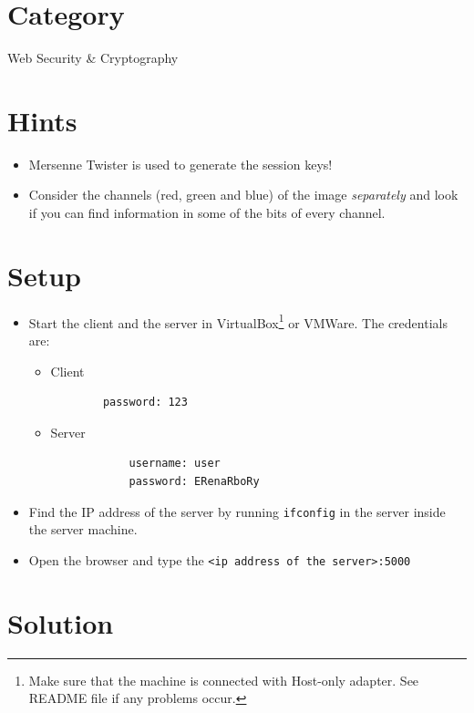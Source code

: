 \documentclass[11pt]{article}
\begin{document}
\section{Category}
Web Security \& Cryptography

\section{Hints}
\begin{itemize}
\item Mersenne Twister is used to generate the session keys!
\item Consider the channels (red, green and blue) of the image \textit{separately} and look if you can find information in some of the bits of every channel. 
\end{itemize}

\section{Setup}
\begin{itemize}
\item Start the client and the server in VirtualBox\footnote{Make sure that the machine is connected with Host-only adapter. See README file if any problems occur.} or VMWare. The credentials are:
\begin{itemize}
	\item Client
	\begin{verbatim}
		password: 123
	\end{verbatim}
	\item Server
		\begin{verbatim}
			username: user
			password: ERenaRboRy
		\end{verbatim}
\end{itemize}
\item Find the IP address of the server by running \texttt{ifconfig} in the server inside the server machine.
\item Open the browser and type the \texttt{<ip address of the server>:5000}
\end{itemize}


\section{Solution}
\end{document}
